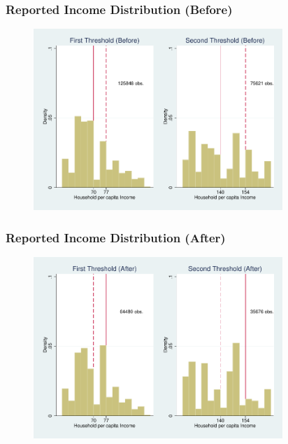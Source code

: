\documentclass[xcolor=pdftex,dvipsnames,table]{beamer}
\begin{document}
\begin{frame}
\frametitle{Reported Income Distribution (Before)}
\begin{figure}[H]
\begin{center}
\includegraphics[height=2.7in]{fig_cadDomRs_Before.pdf}
\end{center}
\end{figure}
\end{frame}

\begin{frame}
\frametitle{Reported Income Distribution (After)}
\begin{figure}[H]
\begin{center}
\includegraphics[height=2.7in]{fig_cadDomRs_After.pdf}
\end{center}
\end{figure}
\end{frame}
\end{document}
